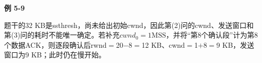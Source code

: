 {\color{ink}\bfseries 例 5-9}\par\vspace{1bp}题干的32 KB是ssthresh，尚未给出初始cwnd，因此第(2)问的cwnd、发送窗口和第(3)问的耗时不能唯一确定。若补充\(cwnd_{0}=\allowbreak{}1 \mathrm{MSS}\)，并将“第8个确认段”计为第8个数据ACK，则逐段确认后rwnd\(=\allowbreak{}\)20\(-\)8\(=\allowbreak{}\)12 KB、cwnd\(=\allowbreak{}\)1\(+\allowbreak{}\)8\(=\allowbreak{}\)9 KB，发送窗口为9 KB；此时仍在慢开始。
